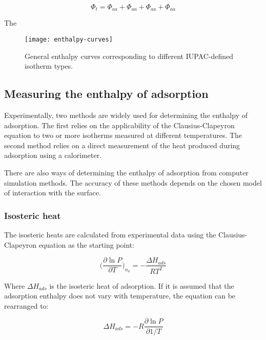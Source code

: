 \begin{equation}\label{calo:eqn:interactions}
  \Phi_t = \Phi_{aa} + \Phi_{aa} + \Phi_{aa} + \Phi_{aa}
\end{equation}

The 

\begin{figure}[htb]
    \centering

    \texttt{[image: enthalpy-curves]}
    \caption{
      General enthalpy curves corresponding to different 
      IUPAC-defined isotherm 
      types\cite{llewellynGasAdsorptionMicrocalorimetry2005}.
    }%
    \label{calo:fig:enthalpy-iupac-iso}

\end{figure}


\subsection{Measuring the enthalpy of adsorption}

Experimentally, two methods are widely used for determining the 
enthalpy of adsorption. The first relies on the applicability of the 
Clausius-Clapeyron equation to two or more isotherms measured 
at different temperatures. The second method relies on a 
direct measurement of the heat produced during adsorption 
using a calorimeter.

There are also ways of determining the enthalpy of adsorption
from computer simulation methods. The accuracy of these methods
depends on the chosen model of interaction with the surface.

\subsubsection{Isosteric heat}

The isosteric heats are calculated from experimental data using the
Clausius-Clapeyron equation as the starting point:

\begin{equation}
    \Big( \frac{\partial \ln P}{\partial T} \Big)_{n_a} = -\frac{\Delta H_{ads}}{R T^2}
\end{equation}

Where \(\Delta H_{ads}\) is the isosteric heat of adsorption.
If it is assumed that the adsorption enthalpy does not vary with 
temperature, the equation can be rearranged to:

\begin{equation}
    \Delta H_{ads} = - R \frac{\partial \ln P}{\partial 1 / T}
\end{equation}

